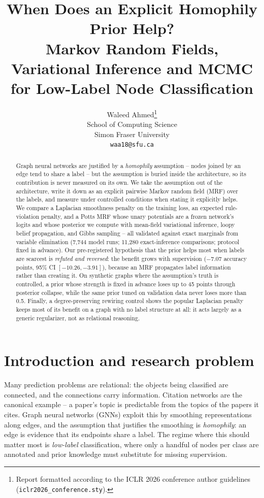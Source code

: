 \documentclass{article}
\title{
When Does an Explicit Homophily Prior Help? \\
Markov Random Fields, Variational Inference and MCMC \\
for Low-Label Node Classification
}
\author{Waleed Ahmed\thanks{Report formatted according to the ICLR 2026 conference
author guidelines (\texttt{iclr2026\_conference.sty}).} \\
School of Computing Science \\
Simon Fraser University \\
\texttt{waa18@sfu.ca}
}
\begin{document}
\maketitle

\begin{abstract}
Graph neural networks are justified by a \emph{homophily} assumption -- nodes joined by an edge
tend to share a label -- but the assumption is buried inside the architecture, so its
contribution is never measured on its own. We take the assumption out of the architecture, write
it down as an explicit pairwise Markov random field (MRF) over the labels, and measure under
controlled conditions when stating it explicitly helps. We compare a Laplacian smoothness
penalty on the training loss, an expected rule-violation penalty, and a Potts MRF whose unary
potentials are a frozen network's logits and whose posterior we compute with mean-field
variational inference, loopy belief propagation, and Gibbs sampling -- all validated against
exact marginals from variable elimination (7{,}744 model runs; 11{,}280 exact-inference
comparisons; protocol fixed in advance). Our pre-registered hypothesis that the prior helps most
when labels are scarcest is \emph{refuted and reversed}: the benefit grows with supervision
($-7.07$ accuracy points, 95\% CI $[-10.26,-3.91]$), because an MRF propagates label information
rather than creating it. On synthetic graphs where the assumption's truth is controlled, a prior
whose strength is fixed in advance loses up to 45 points through posterior collapse, while the
same prior tuned on validation data never loses more than 0.5. Finally, a degree-preserving
rewiring control shows the popular Laplacian penalty keeps most of its benefit on a graph with
no label structure at all: it acts largely as a generic regularizer, not as relational
reasoning.
\end{abstract}

\section{Introduction and research problem}

Many prediction problems are relational: the objects being classified are connected, and the
connections carry information. Citation networks are the canonical example -- a paper's topic is
predictable from the topics of the papers it cites. Graph neural networks (GNNs) exploit this by
smoothing representations along edges, and the assumption that justifies the smoothing is
\emph{homophily}: an edge is evidence that its endpoints share a label. The regime where this
should matter most is \emph{low-label} classification, where only a handful of nodes per class
are annotated and prior knowledge must substitute for missing supervision.
\end{document}
